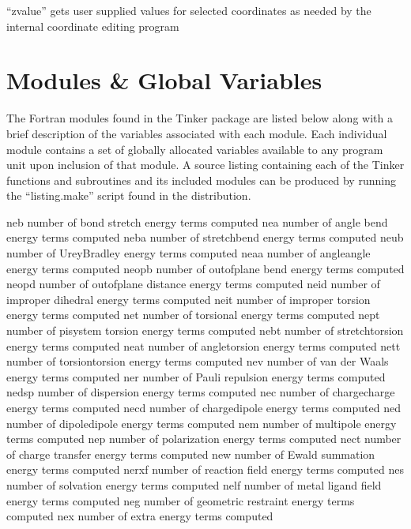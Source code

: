 \documentclass[letterpaper,11pt,english]{sphinxmanual}
\begin{document}

“zvalue” gets user supplied values for selected coordinates
as needed by the internal coordinate editing program


\chapter{Modules \& Global Variables}
\label{\detokenize{text/modules:modules-global-variables}}\label{\detokenize{text/modules::doc}}
The Fortran modules found in the Tinker package are listed below along with a brief description of the variables associated with each module. Each individual module contains a set of globally allocated variables available to any program unit upon inclusion of that module. A source listing containing each of the Tinker functions and subroutines and its included modules can be produced by running the “listing.make” script found in the distribution.


\begin{sphinxVerbatim}[commandchars=\\\{\}]
neb             number of bond stretch energy terms computed
nea             number of angle bend energy terms computed
neba            number of stretch\PYGZhy{}bend energy terms computed
neub            number of Urey\PYGZhy{}Bradley energy terms computed
neaa            number of angle\PYGZhy{}angle energy terms computed
neopb           number of out\PYGZhy{}of\PYGZhy{}plane bend energy terms computed
neopd           number of out\PYGZhy{}of\PYGZhy{}plane distance energy terms computed
neid            number of improper dihedral energy terms computed
neit            number of improper torsion energy terms computed
net             number of torsional energy terms computed
nept            number of pi\PYGZhy{}system torsion energy terms computed
nebt            number of stretch\PYGZhy{}torsion energy terms computed
neat            number of angle\PYGZhy{}torsion energy terms computed
nett            number of torsion\PYGZhy{}torsion energy terms computed
nev             number of van der Waals energy terms computed
ner             number of Pauli repulsion energy terms computed
nedsp           number of dispersion energy terms computed
nec             number of charge\PYGZhy{}charge energy terms computed
necd            number of charge\PYGZhy{}dipole energy terms computed
ned             number of dipole\PYGZhy{}dipole energy terms computed
nem             number of multipole energy terms computed
nep             number of polarization energy terms computed
nect            number of charge transfer energy terms computed
new             number of Ewald summation energy terms computed
nerxf           number of reaction field energy terms computed
nes             number of solvation energy terms computed
nelf            number of metal ligand field energy terms computed
neg             number of geometric restraint energy terms computed
nex             number of extra energy terms computed
\end{sphinxVerbatim}
\end{document}
